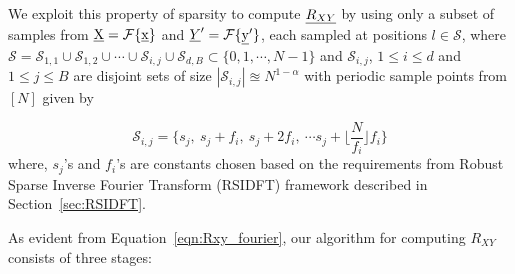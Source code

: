  We exploit this property of sparsity to compute $\underline{R_{XY}}$ by using only a subset of samples from $\underline{\mathrm{X}} = \mathcal{F}\{\underline{\mathrm{x}}\} $ and $\underline{Y}' = \mathcal{F}\{\underline{\mathrm{y}}'\} $, each sampled at positions $l \in \mathcal{S}$, where $\mathcal{S} = \mathcal{S}_{1,1} \cup \mathcal{S}_{1,2} \cup \cdots \cup \mathcal{S}_{i,j} \cup  \mathcal{S}_{d,B} \subset \{ 0,1,\cdots ,N-1 \}$ and $\mathcal{S}_{i,j}$, $1 \leq i \leq d $ and  $1 \leq j \leq B $ are disjoint sets of size $|\mathcal{S}_{i,j}| \approxeq N^{1-\alpha}$ with periodic sample points from $[N]$ given by 
 
 \begin{equation}
 \label{eqn:sampling_sets}\mathcal{S}_{i,j} = \{s_j,\ s_j + f_i,\ s_j + 2f_i,\ \cdots s_j + \lfloor{\frac{N}{f_i} }\rfloor f_i \}
 \end{equation}
   where, $s_j$'s and $f_i$'s are constants chosen based on the requirements from Robust Sparse Inverse Fourier Transform (RSIDFT) framework described in Section~\ref{sec:RSIDFT}.

 As evident from Equation~\ref{eqn:Rxy_fourier}, our algorithm for computing $R_{XY}$ consists of three stages:

